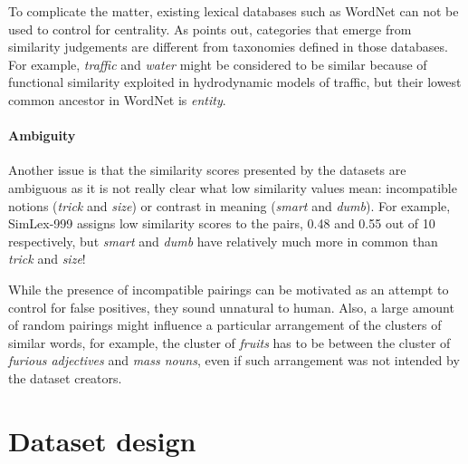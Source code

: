 \documentclass[11pt]{article}
\begin{document}
To complicate the matter, existing lexical databases such as WordNet \cite{Miller:1995:WLD:219717.219748} can not be used to control for centrality. As  points out, categories that emerge from similarity judgements are different from taxonomies defined in those databases. For example, \textit{traffic} and \textit{water} might be considered to be similar because of functional similarity exploited in hydrodynamic models of traffic, but their lowest common ancestor in WordNet is \textit{entity}.

\paragraph{Ambiguity}

Another issue is that the similarity scores presented by the datasets are ambiguous as it is not really clear what low similarity values mean: incompatible notions (\textit{trick} and \textit{size}) or contrast in meaning (\textit{smart} and \textit{dumb}). For example, SimLex-999 assigns low similarity scores to the pairs, 0.48 and 0.55 out of 10 respectively, but \textit{smart} and \textit{dumb} have relatively much more in common than \textit{trick} and \textit{size}!

While the presence of incompatible pairings can be motivated as an attempt to control for false positives, they sound unnatural to human. Also, a large amount of random pairings\footnotemark{} might influence a particular arrangement of the clusters of similar words, for example, the cluster of \textit{fruits} has to be between the cluster of \textit{furious adjectives} and \textit{mass nouns}, even if such arrangement was not intended by the dataset creators.

\section{Dataset design}

%
\end{document}
